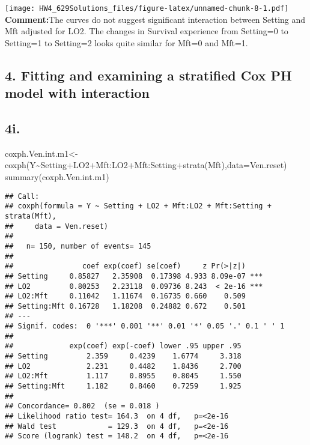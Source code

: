 \documentclass[
]{article}
\newenvironment{Shaded}{\begin{snugshade}}{\end{snugshade}}
\newcommand{\AttributeTok}[1]{\textcolor[rgb]{0.77,0.63,0.00}{#1}}
\newcommand{\FunctionTok}[1]{\textcolor[rgb]{0.00,0.00,0.00}{#1}}
\newcommand{\NormalTok}[1]{#1}
\newcommand{\OtherTok}[1]{\textcolor[rgb]{0.56,0.35,0.01}{#1}}
\newcommand{\SpecialCharTok}[1]{\textcolor[rgb]{0.00,0.00,0.00}{#1}}
\begin{document}
\texttt{[image: HW4\_629Solutions\_files/figure-latex/unnamed-chunk-8-1.pdf]}
\textbf{Comment:}The curves do not suggest significant interaction
between Setting and Mft adjusted for LO2. The changes in Survival
experience from Setting=0 to Setting=1 to Setting=2 looks quite similar
for Mft=0 and Mft=1.

\hypertarget{fitting-and-examining-a-stratified-cox-ph-model-with-interaction}{%
\subsection{4. Fitting and examining a stratified Cox PH model with
interaction}\label{fitting-and-examining-a-stratified-cox-ph-model-with-interaction}}

\hypertarget{i.}{%
\subsection{4i.}\label{i.}}

\begin{Shaded}
\begin{Highlighting}[]
\NormalTok{coxph.Ven.int.m1}\OtherTok{\textless{}{-}}\FunctionTok{coxph}\NormalTok{(Y}\SpecialCharTok{\textasciitilde{}}\NormalTok{Setting}\SpecialCharTok{+}\NormalTok{LO2}\SpecialCharTok{+}\NormalTok{Mft}\SpecialCharTok{:}\NormalTok{LO2}\SpecialCharTok{+}\NormalTok{Mft}\SpecialCharTok{:}\NormalTok{Setting}\SpecialCharTok{+}\FunctionTok{strata}\NormalTok{(Mft),}\AttributeTok{data=}\NormalTok{Ven.reset)}
\FunctionTok{summary}\NormalTok{(coxph.Ven.int.m1)}
\end{Highlighting}
\end{Shaded}

\begin{verbatim}
## Call:
## coxph(formula = Y ~ Setting + LO2 + Mft:LO2 + Mft:Setting + strata(Mft), 
##     data = Ven.reset)
## 
##   n= 150, number of events= 145 
## 
##                coef exp(coef) se(coef)     z Pr(>|z|)    
## Setting     0.85827   2.35908  0.17398 4.933 8.09e-07 ***
## LO2         0.80253   2.23118  0.09736 8.243  < 2e-16 ***
## LO2:Mft     0.11042   1.11674  0.16735 0.660    0.509    
## Setting:Mft 0.16728   1.18208  0.24882 0.672    0.501    
## ---
## Signif. codes:  0 '***' 0.001 '**' 0.01 '*' 0.05 '.' 0.1 ' ' 1
## 
##             exp(coef) exp(-coef) lower .95 upper .95
## Setting         2.359     0.4239    1.6774     3.318
## LO2             2.231     0.4482    1.8436     2.700
## LO2:Mft         1.117     0.8955    0.8045     1.550
## Setting:Mft     1.182     0.8460    0.7259     1.925
## 
## Concordance= 0.802  (se = 0.018 )
## Likelihood ratio test= 164.3  on 4 df,   p=<2e-16
## Wald test            = 129.3  on 4 df,   p=<2e-16
## Score (logrank) test = 148.2  on 4 df,   p=<2e-16
\end{verbatim}
\end{document}
